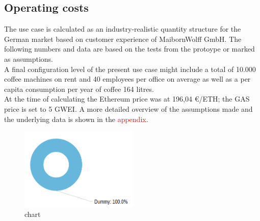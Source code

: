 \documentclass[conference]{IEEEtran}
\begin{document}
\subsection{Operating costs}
The use case is calculated as an industry-realistic quantity structure for the German market based on customer experience of MaibornWolff GmbH. The following numbers and data are based on the tests from the protoype or marked as assumptions.\\
A final configuration level of the present use case might include a total of 10.000 coffee machines on rent and 40 employees per office on average as well as a per capita consumption per year of coffee 164 litres.\\
At the time of calculating the Ethereum price was at 196,04 €/ETH; the GAS price is set to 5 GWEI. A more detailed overview of the assumptions made and the underlying data is shown in the \textcolor{red}{appendix}.\\

\begin{figure}[hbt]
 \centering
 \includegraphics[width=0.5\textwidth]{media/placeholder_chart.png}
 \caption{chart}
 \label{fig:costs}
\end{figure}
\end{document}
